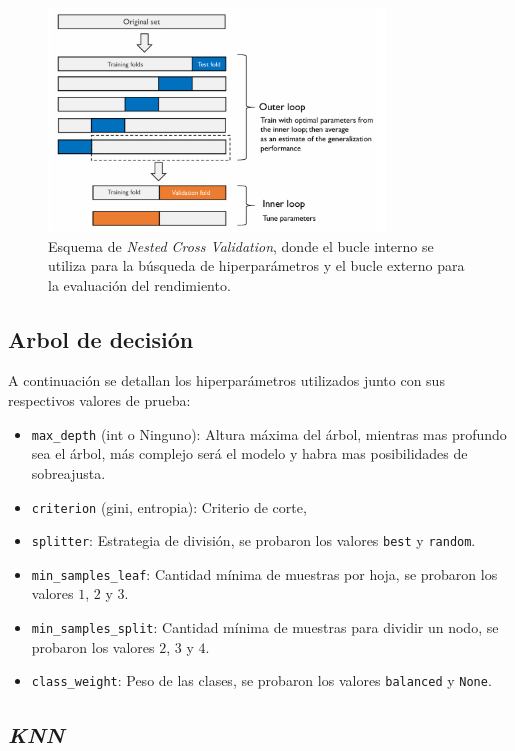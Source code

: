 \documentclass[12pt,a4paper]{article}
\begin{document}
\begin{figure}[H]
    \centering
    \includegraphics[width=0.8\textwidth]{Imagenes/nested-kfold-cv.png}
    \caption{Esquema de \textit{Nested Cross Validation}, donde el bucle interno se utiliza para la búsqueda de hiperparámetros y el bucle externo para la evaluación del rendimiento.}
    \label{fig:nested_cross_validation}
\end{figure}

\subsection{Arbol de decisión}
A continuación se detallan los hiperparámetros utilizados junto con sus respectivos valores de prueba:

\begin{itemize}
    \item \texttt{max\_depth} (int o Ninguno): Altura máxima del árbol, mientras mas profundo sea el árbol, más complejo será el modelo y habra mas posibilidades de sobreajusta.
    \item \texttt{criterion} ({gini, entropia}): Criterio de corte,
    \item \texttt{splitter}: Estrategia de división, se probaron los valores \texttt{best} y \texttt{random}.
    \item \texttt{min\_samples\_leaf}: Cantidad mínima de muestras por hoja, se probaron los valores $1$, $2$ y $3$.
    \item \texttt{min\_samples\_split}: Cantidad mínima de muestras para dividir un nodo, se probaron los valores $2$, $3$ y $4$.
    \item \texttt{class\_weight}: Peso de las clases, se probaron los valores \texttt{balanced} y \texttt{None}.
\end{itemize}
\subsection{\textit{KNN}}
\end{document}
